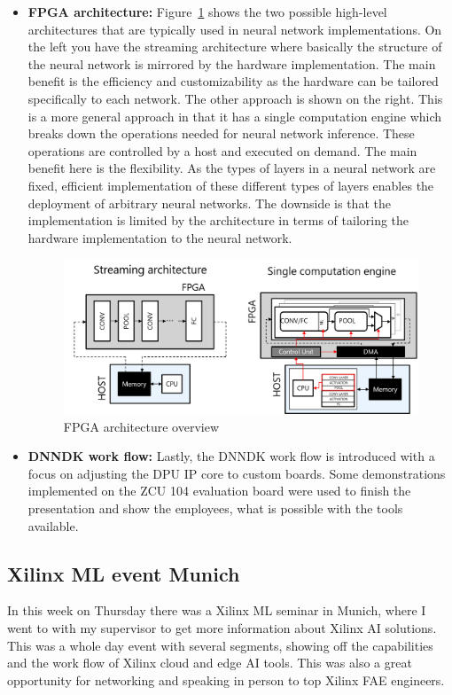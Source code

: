 \begin{itemize}
	\item \textbf{\ac{FPGA} architecture:} Figure~\ref{fig:fpga_arch} shows the two possible high-level architectures that are typically used in neural network implementations. On the left you have the streaming architecture where basically the structure of the neural network is mirrored by the hardware implementation. The main benefit is the efficiency and customizability as the hardware can be tailored specifically to each network. The other approach is shown on the right. This is a more general approach in that it has a single computation engine which breaks down the operations needed for neural network inference. These operations are controlled by a host and executed on demand. The main benefit here is the flexibility. As the types of layers in a neural network are fixed, efficient implementation of these different types of layers enables the deployment of arbitrary neural networks. The downside is that the implementation is limited by the architecture in terms of tailoring the hardware implementation to the neural network.
	\begin{figure}[!htb]
	\centering
		\includegraphics[width=\textwidth]{bilder/FPGA_arch.png}
		\caption{\acs{FPGA} architecture overview}
		\label{fig:fpga_arch}
\end{figure}
	\item \textbf{\ac{DNNDK} work flow:} Lastly, the \ac{DNNDK} work flow is introduced with a focus on adjusting the \ac{DPU} \ac{IP} core to custom boards. Some demonstrations implemented on the ZCU 104 evaluation board were used to finish the presentation and show the employees, what is possible with the tools available.
\end{itemize}
\subsection{Xilinx \acs{ML} event Munich}
In this week on Thursday there was a Xilinx \ac{ML} seminar in Munich, where I went to with my supervisor to get more information about Xilinx \ac{AI} solutions. This was a whole day event with several segments, showing off the capabilities and the work flow of Xilinx cloud and edge \ac{AI} tools. This was also a great opportunity for networking and speaking in person to top Xilinx \ac{FAE} engineers.

